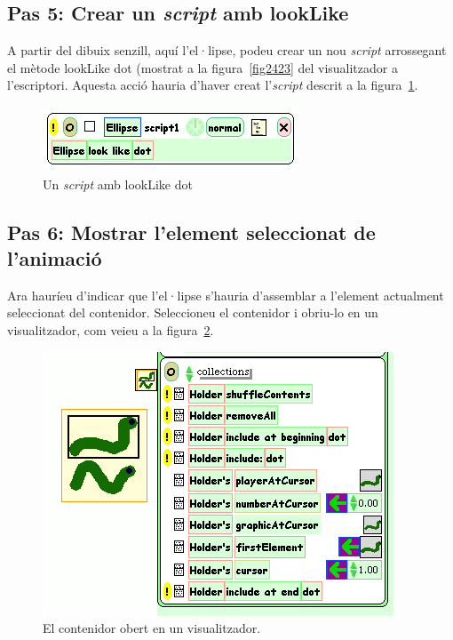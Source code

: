 \subsection{Pas 5: Crear un \emph{script} amb \textsf{lookLike}}
A partir del dibuix senzill, aquí l'el·lipse, podeu crear un nou \emph{script} arrossegant el mètode \textsf{lookLike dot} (mostrat a la figura~\ref{fig2423} del visualitzador a l'escriptori. Aquesta acció hauria d'haver creat l'\emph{script} descrit a la figura~\ref{fig2424}.
\begin{figure}[h!]
\begin{center}
\includegraphics[scale=0.75]{Imatges/figura24-24}
\end{center}
\caption{Un \emph{script} amb \textsf{\upshape lookLike dot}}
\label{fig2424}
\end{figure}

\subsection{Pas 6: Mostrar l'element seleccionat de l'animació}
Ara hauríeu d'indicar que l'el·lipse s'hauria d'assemblar a l'element actualment seleccionat del contenidor. Seleccioneu el contenidor i obriu-lo en un visualitzador, com veieu a la figura~\ref{fig2425}. 
\begin{figure}[h!]
\begin{center}
\includegraphics[scale=0.5]{Imatges/figura24-25}
\end{center}
\caption{El contenidor obert en un visualitzador.}
\label{fig2425}
\end{figure}

